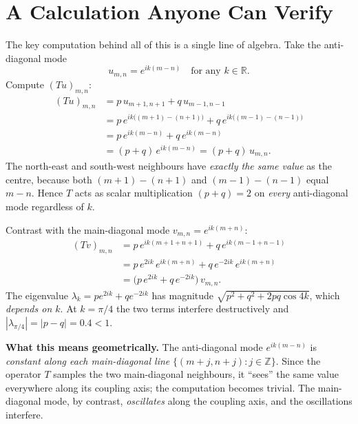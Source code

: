 \documentclass[11pt]{article}
\begin{document}
\section*{A Calculation Anyone Can Verify}

\noindent
The key computation behind all of this is a single line of algebra.
Take the anti-diagonal mode
\[
  u_{m,n} = e^{ik(m-n)}
  \quad\text{for any }k\in\mathbb{R}.
\]
Compute $(Tu)_{m,n}$:
\begin{align*}
  (Tu)_{m,n}
  &= p\,u_{m+1,n+1} + q\,u_{m-1,n-1} \\
  &= p\,e^{ik\bigl((m+1)-(n+1)\bigr)} + q\,e^{ik\bigl((m-1)-(n-1)\bigr)} \\
  &= p\,e^{ik(m-n)} + q\,e^{ik(m-n)} \\
  &= (p+q)\,e^{ik(m-n)} = (p+q)\,u_{m,n}.
\end{align*}
The north-east and south-west neighbours have \emph{exactly the same
value} as the centre, because both $(m+1)-(n+1)$ and $(m-1)-(n-1)$
equal $m-n$.  Hence $T$ acts as scalar multiplication $(p+q) = 2$ on
\emph{every} anti-diagonal mode regardless of $k$.

\medskip\noindent
Contrast with the main-diagonal mode $v_{m,n} = e^{ik(m+n)}$:
\begin{align*}
  (Tv)_{m,n}
  &= p\,e^{ik(m+1+n+1)} + q\,e^{ik(m-1+n-1)} \\
  &= p\,e^{2ik}\,e^{ik(m+n)} + q\,e^{-2ik}\,e^{ik(m+n)} \\
  &= \bigl(p\,e^{2ik}+q\,e^{-2ik}\bigr)\,v_{m,n}.
\end{align*}
The eigenvalue $\lambda_k = p e^{2ik} + q e^{-2ik}$ has magnitude
$\sqrt{p^2+q^2+2pq\cos 4k}$, which \emph{depends on $k$}.  At
$k = \pi/4$ the two terms interfere destructively and
$|\lambda_{\pi/4}| = |p-q| = 0.4 < 1$.

\medskip\noindent
\textbf{What this means geometrically.}
The anti-diagonal mode $e^{ik(m-n)}$ is \emph{constant along each
main-diagonal line} $\{(m+j,n+j):j\in\mathbb{Z}\}$.  Since the
operator $T$ samples the two main-diagonal neighbours, it ``sees''
the same value everywhere along its coupling axis; the computation
becomes trivial.  The main-diagonal mode, by contrast, \emph{oscillates}
along the coupling axis, and the oscillations interfere.
\end{document}
